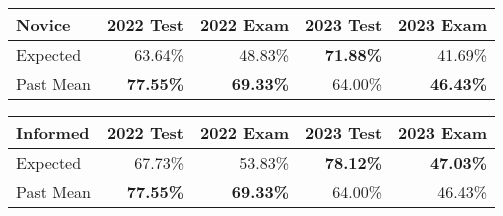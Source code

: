 \documentclass[sigconf,authordraft]{acmart}
\begin{document}

\begin{table*}
    \centering
    \caption{The expected scores of assessments compared with the mean scores of past students}
    \label{Score}
    \begin{tabular}{|l|r|r|r|r|}
        \hline
        \multicolumn{1}{|p{1.2cm}|}{Novice} & \multicolumn{1}{c|}{2022 Test} & \multicolumn{1}{c|}{2022 Exam} & \multicolumn{1}{c|}{2023 Test} & \multicolumn{1}{c|}{2023 Exam} \\ \hline\hline
        Expected & 63.64\% & 48.83\% & \textbf{71.88\%} & 41.69\% \\ \hline
        Past Mean & \textbf{77.55\%} & \textbf{69.33\%} & 64.00\% & \textbf{46.43\%} \\ \hline
    \end{tabular}
    \;
    \begin{tabular}{|l|r|r|r|r|}
        \hline
        \multicolumn{1}{|p{1.2cm}|}{Informed} & \multicolumn{1}{c|}{2022 Test} & \multicolumn{1}{c|}{2022 Exam} & \multicolumn{1}{c|}{2023 Test} & \multicolumn{1}{c|}{2023 Exam} \\ \hline\hline
        Expected & 67.73\% & 53.83\% & \textbf{78.12\%} & \textbf{47.03\%} \\ \hline
        Past Mean & \textbf{77.55\%} & \textbf{69.33\%} & 64.00\% & 46.43\% \\ \hline
    \end{tabular}
\end{table*}
\end{document}
